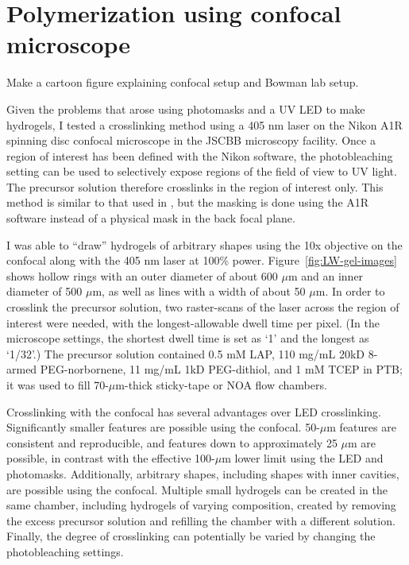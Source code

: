\section{Polymerization using confocal microscope}
 Make a cartoon figure explaining confocal setup and Bowman lab setup.

Given the problems that arose using photomasks and a UV LED to make hydrogels, I tested a crosslinking method using a 405 nm laser on the Nikon A1R spinning disc confocal microscope in the JSCBB microscopy facility.  Once a region of interest has been defined with the Nikon software, the photobleaching setting can be used to selectively expose regions of the field of view to UV light.  The precursor solution therefore crosslinks in the region of interest only.  This method is similar to that used in \cite{paustian13}, but the masking is done using the A1R software instead of a physical mask in the back focal plane.

I was able to ``draw'' hydrogels of arbitrary shapes using the 10x objective on the confocal along with the 405 nm laser at 100\% power.  Figure~\ref{fig:LW-gel-images} shows hollow rings with an outer diameter of about 600 $\mu$m and an inner diameter of 500 $\mu$m, as well as lines with a width of about 50 $\mu$m.  In order to crosslink the precursor solution, two raster-scans of the laser across the region of interest were needed, with the longest-allowable dwell time per pixel.  (In the microscope settings, the shortest dwell time is set as `1' and the longest as `1/32'.)  The precursor solution contained 0.5 mM LAP, 110 mg/mL 20kD 8-armed PEG-norbornene, 11 mg/mL 1kD PEG-dithiol, and 1 mM TCEP in PTB; it was used to fill 70-$\mu$m-thick sticky-tape or NOA flow chambers.


Crosslinking with the confocal has several advantages over LED crosslinking.  Significantly smaller features are possible using the confocal.  50-$\mu$m features are consistent and reproducible, and features down to approximately 25 $\mu$m are possible, in contrast with the effective 100-$\mu$m lower limit using the LED and photomasks.  Additionally, arbitrary shapes, including shapes with inner cavities, are possible using the confocal.  Multiple small hydrogels can be created in the same chamber, including hydrogels of varying composition, created by removing the excess precursor solution and refilling the chamber with a different solution.  Finally, the degree of crosslinking can potentially be varied by changing the photobleaching settings.

